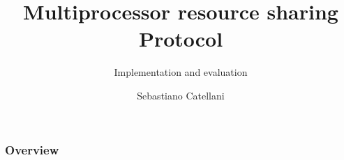 \documentclass{beamer}
\DeclarePairedDelimiter\ceil{\lceil}{\rceil}
\begin{document}
\title[MrsP]{Multiprocessor resource sharing Protocol}
\subtitle{Implementation and evaluation}
\author{Sebastiano Catellani}
\date{}

\begin{frame}
\titlepage
\end{frame}

\begin{frame}
\frametitle{Overview}
\tableofcontents
\end{frame}

% 





% 



%         
%      
















\end{document}
